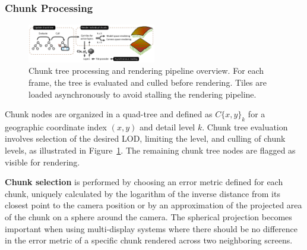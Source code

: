 \documentclass[journal]{vgtc}                %
\newcommand{\fig}[1]{Figure~\ref{fig:#1}}
\begin{document}
\subsubsection{Chunk Processing} \label{sec:chunktree}
\begin{figure}
  \centering
    \includegraphics[width=0.5\textwidth]{figures/rendering-pipeline.pdf}
  \caption{Chunk tree processing and rendering pipeline overview. For each frame, the tree is evaluated and culled before rendering. Tiles are loaded asynchronously to avoid stalling the rendering pipeline.}  \vspace{-3mm}
  \label{fig:chunkproc}
\end{figure}



Chunk nodes are organized in a quad-tree and defined as $C\{x, y\}_k$ for a geographic coordinate index $\left( x,y \right)$ and detail level $k$.
Chunk tree evaluation involves selection of the desired LOD, limiting the level, and culling of chunk levels, as illustrated in \fig{chunkproc}.
The remaining chunk tree nodes are flagged as visible for rendering.



\noindent\textbf{Chunk selection} is performed by choosing an error metric defined for each chunk, uniquely calculated by the logarithm of the inverse distance from its closest point to the camera position or by an approximation of the projected area of the chunk on a sphere around the camera.
The spherical projection becomes important when using multi-display systems where there should be no difference in the error metric of a specific chunk rendered across two neighboring screens.
\end{document}
